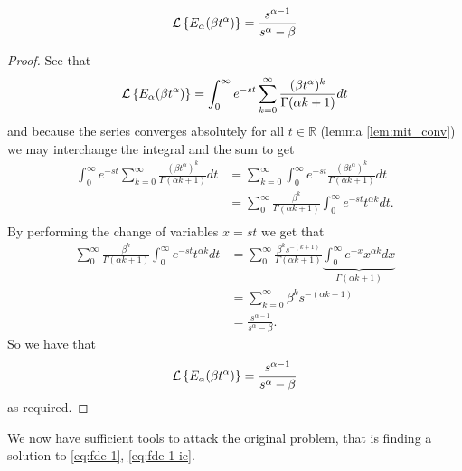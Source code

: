 \documentclass{unswmaths}
\begin{document}
\begin{lemma}
\label{lem:lap_mit}
	\begin{align*}	
		\mathcal{L} \left\{  E_\alpha (\beta t^\alpha) \right\} = \frac{s^{\alpha - 1}}{s^\alpha - \beta}
	\end{align*}
\end{lemma}
\begin{proof}
	See that
	\begin{align*}
		\mathcal{L} \left\{  E_\alpha (\beta t^\alpha) \right\} = \int_0^\infty e^{-st} \sum_{k=0}^\infty \frac{(\beta t^\alpha)^k}{\Gamma(\alpha k+1)} dt
	\end{align*}
	and because the series converges absolutely for all $ t \in \mathbb{R} $ (lemma \ref{lem:mit_conv}) we may interchange the integral
	and the sum to get
	\begin{align*}
		\int_0^\infty e^{-st} \sum_{k=0}^\infty \frac{(\beta t^\alpha)^k}{\Gamma(\alpha k+1)} dt &= \sum_{k=0}^\infty \int_0^\infty e^{-st} \frac{(\beta t^\alpha)^k}{\Gamma(\alpha k + 1)} dt \\
			&= \sum_0^\infty \frac{\beta^k}{\Gamma(\alpha k + 1)} \int_0^\infty e^{-st} t^{\alpha k} dt. \\
	\end{align*}
	By performing the change of variables $ x =st $ we get that 
	\begin{align*}
		\sum_0^\infty \frac{\beta^k}{\Gamma(\alpha k + 1)} \int_0^\infty e^{-st} t^{\alpha k} dt 
			&= \sum_0^\infty \frac{\beta^k s^{-(k+1)}}{\Gamma(\alpha k + 1)} \underbrace{\int_0^\infty e^{-x} x^{\alpha k} dx}_{\Gamma(\alpha k + 1)} \\
			&= \sum_{k=0}^\infty \beta^{k} s^{-(\alpha k + 1)} \\
			&= \frac{s^{\alpha-1}}{s^\alpha - \beta}.		
	\end{align*}
	So we have that 
	\begin{align*}	
		\mathcal{L} \left\{  E_\alpha (\beta t^\alpha) \right\} = \frac{s^{\alpha - 1}}{s^\alpha - \beta}
	\end{align*}	
	as required.
\end{proof}

We now have sufficient tools to attack the original problem, that is finding a solution to \eqref{eq:fde-1}, \eqref{eq:fde-1-ic}.
\end{document}
